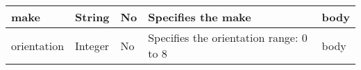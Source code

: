 \begin{longtable}{|>{\raggedright}p{}|>{\raggedright}p{}|>{\raggedright}p{}|>{\raggedright}p{}|>{\raggedright}p{}|}
\hline 
{\footnotesize{make}} & {\footnotesize{String}} & {\footnotesize{No}} & {\footnotesize{Specifies the make}} & {\footnotesize{body}}\tabularnewline
\hline 
{\footnotesize{orientation}} & {\footnotesize{Integer}} & {\footnotesize{No}} & {\footnotesize{Specifies the orientation range: 0 to 8}} & {\footnotesize{body}}\tabularnewline
\hline 
\end{longtable}{\footnotesize \par}

{\footnotesize{}}
